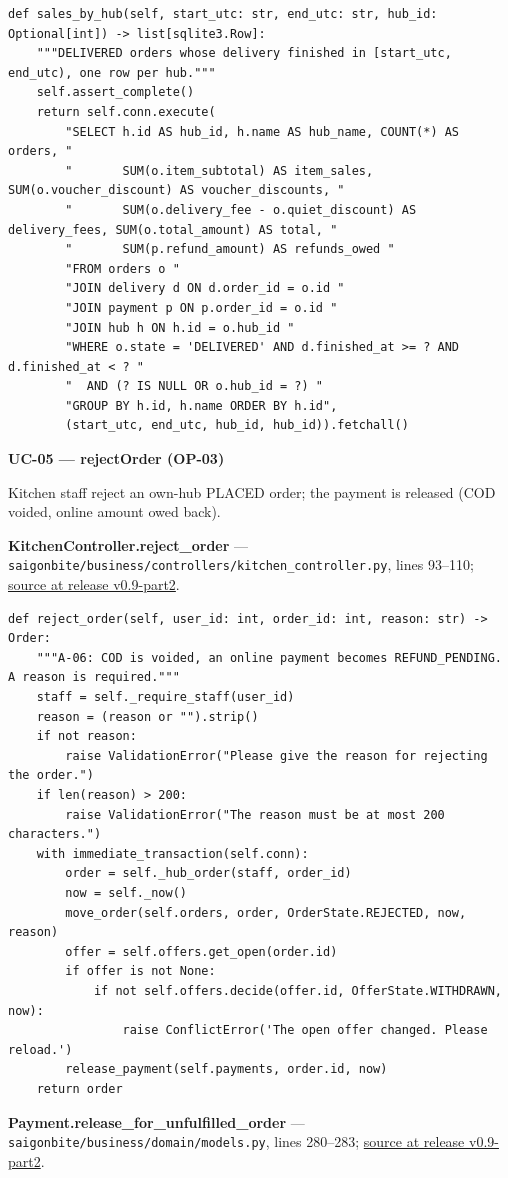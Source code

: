 \begin{lstlisting}
def sales_by_hub(self, start_utc: str, end_utc: str, hub_id: Optional[int]) -> list[sqlite3.Row]:
    """DELIVERED orders whose delivery finished in [start_utc, end_utc), one row per hub."""
    self.assert_complete()
    return self.conn.execute(
        "SELECT h.id AS hub_id, h.name AS hub_name, COUNT(*) AS orders, "
        "       SUM(o.item_subtotal) AS item_sales, SUM(o.voucher_discount) AS voucher_discounts, "
        "       SUM(o.delivery_fee - o.quiet_discount) AS delivery_fees, SUM(o.total_amount) AS total, "
        "       SUM(p.refund_amount) AS refunds_owed "
        "FROM orders o "
        "JOIN delivery d ON d.order_id = o.id "
        "JOIN payment p ON p.order_id = o.id "
        "JOIN hub h ON h.id = o.hub_id "
        "WHERE o.state = 'DELIVERED' AND d.finished_at >= ? AND d.finished_at < ? "
        "  AND (? IS NULL OR o.hub_id = ?) "
        "GROUP BY h.id, h.name ORDER BY h.id",
        (start_utc, end_utc, hub_id, hub_id)).fetchall()
\end{lstlisting}
\textbf{UC-05 --- rejectOrder (OP-03)}

Kitchen staff reject an own-hub PLACED order; the payment is released (COD voided, online amount owed back).

\textbf{KitchenController.reject\_order} --- \texttt{saigonbite/\allowbreak{}business/\allowbreak{}controllers/\allowbreak{}kitchen\_\allowbreak{}controller.\allowbreak{}py}, lines 93--110; \href{\TargetRepo\detokenize{/blob/v0.9-part2/saigonbite/business/controllers/kitchen_controller.py#L93-L110}}{source at release v0.9-part2}.

\begin{lstlisting}
def reject_order(self, user_id: int, order_id: int, reason: str) -> Order:
    """A-06: COD is voided, an online payment becomes REFUND_PENDING. A reason is required."""
    staff = self._require_staff(user_id)
    reason = (reason or "").strip()
    if not reason:
        raise ValidationError("Please give the reason for rejecting the order.")
    if len(reason) > 200:
        raise ValidationError("The reason must be at most 200 characters.")
    with immediate_transaction(self.conn):
        order = self._hub_order(staff, order_id)
        now = self._now()
        move_order(self.orders, order, OrderState.REJECTED, now, reason)
        offer = self.offers.get_open(order.id)
        if offer is not None:
            if not self.offers.decide(offer.id, OfferState.WITHDRAWN, now):
                raise ConflictError('The open offer changed. Please reload.')
        release_payment(self.payments, order.id, now)
    return order
\end{lstlisting}
\textbf{Payment.release\_for\_unfulfilled\_order} --- \texttt{saigonbite/\allowbreak{}business/\allowbreak{}domain/\allowbreak{}models.\allowbreak{}py}, lines 280--283; \href{\TargetRepo\detokenize{/blob/v0.9-part2/saigonbite/business/domain/models.py#L280-L283}}{source at release v0.9-part2}.

